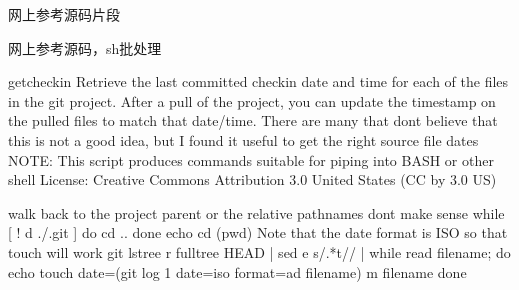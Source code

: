 \documentclass[letterpaper,12pt,english]{sphinxmanual}
\begin{document}
网上参考源码片段

\begin{sphinxVerbatim}[commandchars=\\\{\}]


\end{sphinxVerbatim}

网上参考源码，sh批处理

\begin{sphinxVerbatim}[commandchars=\\\{\}]
\PYGZsh{} getcheckin \PYGZhy{} Retrieve the last committed checkin date and time for
\PYGZsh{}              each of the files in the git project.  After a \PYGZdq{}pull\PYGZdq{}
\PYGZsh{}              of the project, you can update the timestamp on the
\PYGZsh{}              pulled files to match that date/time.  There are many
\PYGZsh{}              that don\PYGZsq{}t believe that this is not a good idea, but
\PYGZsh{}              I found it useful to get the right source file dates
\PYGZsh{}
\PYGZsh{}              NOTE: This script produces commands suitable for
\PYGZsh{}                    piping into BASH or other shell
\PYGZsh{} License: Creative Commons Attribution 3.0 United States
\PYGZsh{} (CC by 3.0 US)

\PYGZsh{}\PYGZsh{}\PYGZsh{}\PYGZsh{}\PYGZsh{}\PYGZsh{}\PYGZsh{}\PYGZsh{}\PYGZsh{}\PYGZsh{}
\PYGZsh{} walk back to the project parent or the relative pathnames don\PYGZsq{}t make
\PYGZsh{} sense
\PYGZsh{}\PYGZsh{}\PYGZsh{}\PYGZsh{}\PYGZsh{}\PYGZsh{}\PYGZsh{}\PYGZsh{}\PYGZsh{}\PYGZsh{}
while [ ! \PYGZhy{}d ./.git ]
do
    cd ..
done
echo \PYGZdq{}cd \PYGZdl{}(pwd)\PYGZdq{}
\PYGZsh{}\PYGZsh{}\PYGZsh{}\PYGZsh{}\PYGZsh{}\PYGZsh{}\PYGZsh{}\PYGZsh{}\PYGZsh{}\PYGZsh{}
\PYGZsh{} Note that the date format is ISO so that touch will work
\PYGZsh{}\PYGZsh{}\PYGZsh{}\PYGZsh{}\PYGZsh{}\PYGZsh{}\PYGZsh{}\PYGZsh{}\PYGZsh{}\PYGZsh{}
git ls\PYGZhy{}tree \PYGZhy{}r \PYGZhy{}\PYGZhy{}full\PYGZhy{}tree HEAD |\PYGZbs{}
    sed \PYGZhy{}e \PYGZdq{}s/.*\PYGZbs{}t//\PYGZdq{} | while read filename; do
    echo \PYGZdq{}touch \PYGZhy{}\PYGZhy{}date=\PYGZbs{}\PYGZdq{}\PYGZdl{}(git log \PYGZhy{}1 \PYGZhy{}\PYGZhy{}date=iso \PYGZhy{}\PYGZhy{}format=\PYGZdq{}\PYGZpc{}ad\PYGZdq{} \PYGZhy{}\PYGZhy{}   \PYGZdq{}\PYGZdl{}filename\PYGZdq{})\PYGZbs{}\PYGZdq{} \PYGZhy{}m \PYGZdl{}filename\PYGZdq{}
done
\end{sphinxVerbatim}
\end{document}
